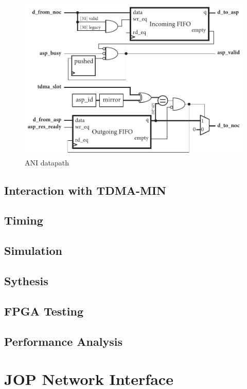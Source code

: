 \documentclass[]{article}
\begin{document}
	\begin{figure}[H]
		\centering
		\includegraphics[width = 5in]{ani_datapath}
		\caption{ANI datapath}
		\label{fig:ani_datapath}
	\end{figure}
	
	\subsection{Interaction with TDMA-MIN}
	
	\subsection{Timing}
	
	\subsection{Simulation}
	
	\subsection{Sythesis}
	
	\subsection{FPGA Testing}
	
	\subsection{Performance Analysis}
	
	
	
	\section{JOP Network Interface}
	
\end{document}
